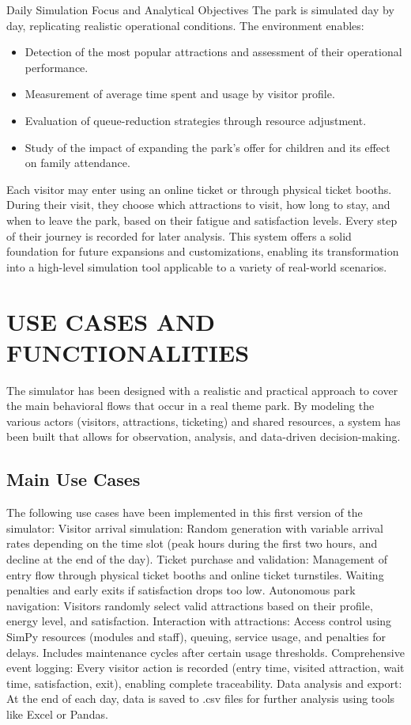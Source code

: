 \documentclass[12pt]{article}
\begin{document}
Daily Simulation Focus and Analytical Objectives
The park is simulated day by day, replicating realistic operational conditions. The environment enables:

\begin{itemize}
\item  Detection of the most popular attractions and assessment of their operational performance.
\item  Measurement of average time spent and usage by visitor profile.
\item  Evaluation of queue-reduction strategies through resource adjustment.
\item  Study of the impact of expanding the park’s offer for children and its effect on family attendance.
\end{itemize}

Each visitor may enter using an online ticket or through physical ticket booths. During their visit, they choose which attractions to visit, how long to stay, and when to leave the park, based on their fatigue and satisfaction levels. Every step of their journey is recorded for later analysis.
This system offers a solid foundation for future expansions and customizations, enabling its transformation into a high-level simulation tool applicable to a variety of real-world scenarios.

\section{USE CASES AND FUNCTIONALITIES}
The simulator has been designed with a realistic and practical approach to cover the main behavioral flows that occur in a real theme park. By modeling the various actors (visitors, attractions, ticketing) and shared resources, a system has been built that allows for observation, analysis, and data-driven decision-making.
\subsection{Main Use Cases}
The following use cases have been implemented in this first version of the simulator:
Visitor arrival simulation: Random generation with variable arrival rates depending on the time slot (peak hours during the first two hours, and decline at the end of the day).
Ticket purchase and validation: Management of entry flow through physical ticket booths and online ticket turnstiles. Waiting penalties and early exits if satisfaction drops too low.
Autonomous park navigation: Visitors randomly select valid attractions based on their profile, energy level, and satisfaction.
Interaction with attractions: Access control using SimPy resources (modules and staff), queuing, service usage, and penalties for delays. Includes maintenance cycles after certain usage thresholds.
Comprehensive event logging: Every visitor action is recorded (entry time, visited attraction, wait time, satisfaction, exit), enabling complete traceability.
Data analysis and export: At the end of each day, data is saved to .csv files for further analysis using tools like Excel or Pandas.
\end{document}
